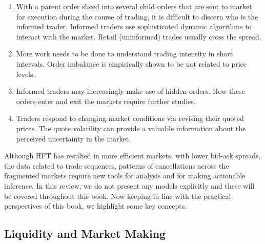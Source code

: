 \begin{enumerate}[--]
\item With a parent order sliced into several child orders that are sent to market for execution during the course of trading, it is difficult to discern who is the informed trader. Informed traders use sophisticated dynamic algorithms to interact with the market. Retail (uninformed) trades usually cross the spread.

\item More work needs to be done to understand trading intensity in short intervals. Order imbalance is empirically shown to be not related to price levels. 

\item Informed traders may increasingly make use of hidden orders. How these orders enter and exit the markets require further studies. 

\item Traders respond to changing market conditions via revising their quoted prices. The quote volatility can provide a valuable information about the perceived uncertainty in the market.
\end{enumerate}


Although HFT has resulted in more efficient markets, with lower bid-ask spreads, the data related to trade sequences, patterns of cancellations across the fragmented markets require new tools for analysis and for making actionable inference. In this review, we do not present any models explicitly and these will be covered throughout this book. Now keeping in line with the practical perspectives of this book, we highlight some key concepts.



\subsection{Liquidity and Market Making\label{sec:liq_market_making}}

